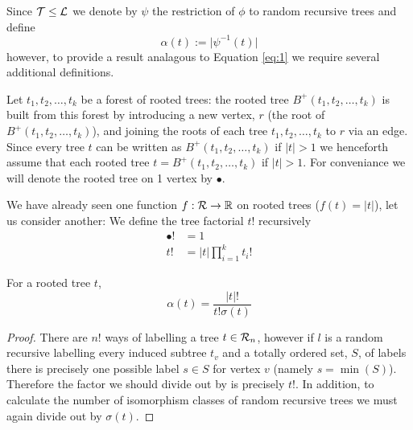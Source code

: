 Since $\operatorname{\mathcal{T}} \leq \operatorname{\mathcal{L}}$ we denote by $\psi$ the restriction of $\phi$ to random recursive trees and define
\[
 \alpha(t) := \lvert \psi^{-1}(t) \rvert 
\]
however, to provide a result analagous to Equation \ref{eq:1} we require several additional definitions. 

Let $t_1,t_2,\dots,t_k$ be a forest of rooted trees: the rooted tree $B^{+}(t_1,t_2,\dots,t_k)$ is built from this forest by 
introducing a new vertex, $r$ (the root of $B^{+}(t_1,t_2,\dots,t_k)$), and joining the roots of each tree $t_1,t_2,\dots,t_k$ 
to $r$ via an edge.  Since every tree $t$ can be written as $B^{+}(t_1,t_2,\dots,t_k)$ if $\lvert t \rvert > 1$ we henceforth 
assume that each rooted tree $t = B^{+}(t_1,t_2,\dots,t_k)$ if $\lvert t \rvert >1$.  For conveniance we will denote the rooted tree on 1 vertex 
by $\bullet$.


We have already seen one function $f: \operatorname{\mathcal{R}} \rightarrow \mathbb{R}$ on rooted trees ($f(t) = \lvert t \rvert$), let us consider 
another: We define the tree factorial $t!$ recursively
\begin{align}
 \bullet! &=  1  \\
 t ! &= \lvert t \rvert \prod_{i=1}^k t_i !
\end{align}

\begin{ex}
\end{ex}

\begin{lem}
For a rooted tree $t$,
 \begin{equation}\label{eq:2}
\alpha(t) = \frac{\lvert t \rvert !}{t!\sigma(t)}
 \end{equation}
\end{lem}


\begin{proof}
 There are $n!$ ways of labelling a tree $t \in \operatorname{\mathcal{R}}_n$, however if $l$ is a random recursive labelling every induced subtree 
 $t_v$ and a totally ordered set, $S$, of labels there is precisely one possible label $s \in S$ for vertex $v$ (namely $s = \min(S)$).  
 Therefore the factor we should divide out by is precisely $t!$.  In addition, to calculate the number of isomorphism classes of 
 random recursive trees we must again divide out by $\sigma(t)$.
\end{proof}

